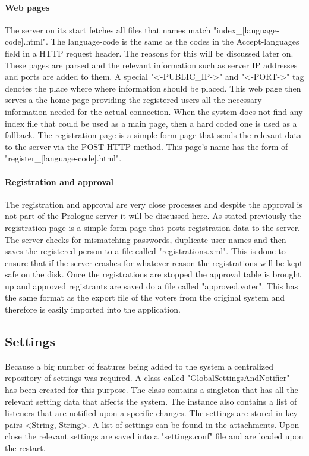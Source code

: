 \documentclass[11pt,twoside,a4paper]{book}
\begin{document}
\paragraph{Web pages}
The server on its start fetches all files that names match "index\_[language-code].html". The language-code is the same as the codes in the Accept-languages\cite{httpHead} field in a HTTP request header. The reasons for this will be discussed later on. These pages are parsed and the relevant information such as server IP addresses and ports are added to them. A special "<-\-PUBLIC\_IP-\->" and "<-\-PORT-\->" tag denotes the place where where information should be placed.  This web page then serves a the home page providing the registered users all the necessary information needed for the actual connection. When the system does not find any index file that could be used as a main page, then a hard coded one is used as a fallback. The registration page is a simple form page that sends the relevant data to the server via the POST HTTP method. This page's name has the form of "register\_[language-code].html".
\paragraph{Registration and approval}
The registration and approval are very close processes and despite the approval is not part of the Prologue server it will be discussed here. As stated previously the registration page is a simple form page that posts registration data to the server. The server checks for mismatching passwords, duplicate user names and then saves the registered person to a file called "registrations.xml". This is done to ensure that if the server crashes for whatever reason the registrations will be kept safe on the disk. Once the registrations are stopped the approval table is brought up and approved registrants are saved do a file called "approved.voter". This has the same format as the export file of the voters from the original system and therefore is easily imported into the application.

\subsection{Settings}
Because a big number of features being added to the system a centralized repository of settings was required. A class called "GlobalSettingsAndNotifier" has been created for this purpose. The class contains a singleton that has all the relevant setting data that affects the system. The instance also contains a list of listeners that are notified upon a specific changes. The settings are stored in key pairs <String, String>. A list of settings can be found in the attachments. Upon close the relevant settings are saved into a "settings.conf" file and are loaded upon the restart.
\end{document}
